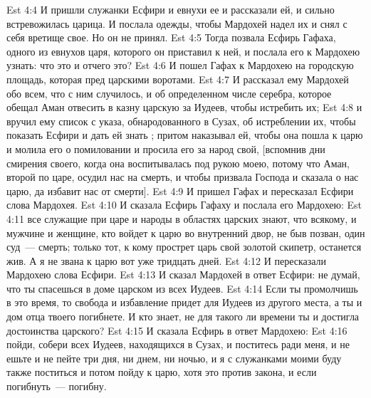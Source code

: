 \rsbpar\vs Est 4:4 И пришли служанки Есфири и евнухи ее и рассказали ей, и сильно встревожилась царица. И послала одежды, чтобы Мардохей надел их и снял с себя вретище свое. Но он не принял.
\vs Est 4:5 Тогда позвала Есфирь Гафаха, одного из евнухов царя, которого он приставил к ней, и послала его к Мардохею узнать: что это и отчего это?
\vs Est 4:6 И пошел Гафах к Мардохею на городскую площадь, которая пред царскими воротами.
\vs Est 4:7 И рассказал ему Мардохей обо всем, что с ним случилось, и об определенном числе серебра, которое обещал Аман отвесить в казну царскую за Иудеев, чтобы истребить их;
\vs Est 4:8 и вручил ему список с указа, обнародованного в Сузах, об истреблении их, чтобы показать Есфири и дать ей знать ; притом наказывал ей, чтобы она пошла к царю и молила его о помиловании и просила его за народ свой, [вспомнив дни смирения своего, когда она воспитывалась под рукою моею, потому что Аман, второй по царе, осудил нас на смерть, и чтобы призвала Господа и сказала о нас царю, да избавит нас от смерти].
\vs Est 4:9 И пришел Гафах и пересказал Есфири слова Мардохея.
\vs Est 4:10 И сказала Есфирь Гафаху и послала его  Мардохею:
\vs Est 4:11 все служащие при царе и народы в областях царских знают, что всякому, и мужчине и женщине, кто войдет к царю во внутренний двор, не быв позван, один суд~--- смерть; только тот, к кому прострет царь свой золотой скипетр, останется жив. А я не звана к царю вот уже тридцать дней.
\vs Est 4:12 И пересказали Мардохею слова Есфири.
\vs Est 4:13 И сказал Мардохей в ответ Есфири: не думай, что ты  спасешься в доме царском из всех Иудеев.
\vs Est 4:14 Если ты промолчишь в это время, то свобода и избавление придет для Иудеев из другого места, а ты и дом отца твоего погибнете. И кто знает, не для такого ли времени ты и достигла достоинства царского?
\vs Est 4:15 И сказала Есфирь в ответ Мардохею:
\vs Est 4:16 пойди, собери всех Иудеев, находящихся в Сузах, и поститесь ради меня, и не ешьте и не пейте три дня, ни днем, ни ночью, и я с служанками моими буду также поститься и потом пойду к царю, хотя это против закона, и если погибнуть~--- погибну.

